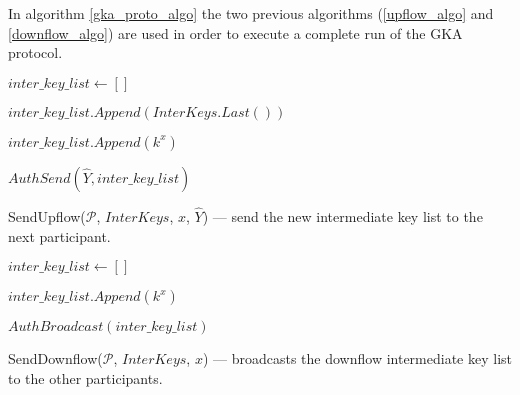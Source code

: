 In algorithm \ref{gka_proto_algo} the two previous algorithms (\ref{upflow_algo} and \ref{downflow_algo}) are used in order to execute a complete run of the GKA protocol.
\vfill
\begin{algorithm}[H]
  \Begin
  {
    $inter\_key\_list \leftarrow []$

    $inter\_key\_list.Append(InterKeys.Last() )$

    {
      $inter\_key\_list.Append(k^x)$
    }

    $AuthSend(\hat{Y}, inter\_key\_list)$
  }
  \caption{SendUpflow($\mathcal{P}$, $InterKeys$, $x$, $\hat{Y}$) --- send the new intermediate key list to the next participant.}
  \label{upflow_algo}
\end{algorithm}
\vfill
\begin{algorithm}[H]
  \Begin
  {
    $inter\_key\_list \leftarrow []$

    {
      $inter\_key\_list.Append(k^x)$
	}

    $AuthBroadcast(inter\_key\_list)$
  }
  \caption{SendDownflow($\mathcal{P}$, $InterKeys$, $x$) --- broadcasts the downflow intermediate key list to the other participants.}
  \label{downflow_algo}
\end{algorithm}
\vfill
